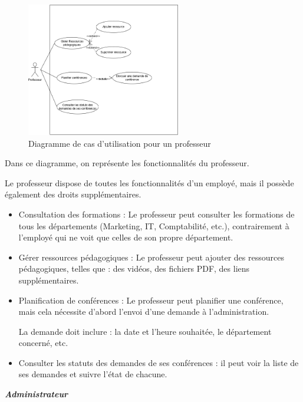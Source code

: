 \documentclass{article}
\begin{document}
\begin{figure}[H]
  \centering
  \includegraphics[width=0.6\textwidth]{prof(1.1).drawio.png}
  \caption{Diagramme de cas d'utilisation pour un professeur}
  \label{fig:profusecase}
\end{figure}
Dans ce diagramme, on représente les fonctionnalités du professeur.

\vspace{0,3cm}

\hspace*{2em} Le professeur dispose de toutes les fonctionnalités d’un employé, mais il possède également des droits supplémentaires.
\begin{itemize}
    \item Consultation des formations : 
Le professeur peut consulter les formations de tous les départements (Marketing, IT, Comptabilité, etc.), contrairement à l’employé qui ne voit que celles de son propre département.


\item Gérer ressources pédagogiques : 
Le professeur peut ajouter des ressources pédagogiques, telles que : des vidéos, des fichiers PDF, des liens supplémentaires.
\item Planification de conférences : 
Le professeur peut planifier une conférence, mais cela nécessite d'abord l'envoi d'une demande à l'administration.

La demande doit inclure : la date et l’heure souhaitée, le département concerné, etc.
\item Consulter les statuts des demandes de ses conférences : il peut voir la liste de ses demandes et suivre l’état de chacune.




\end{itemize}

\begin{center}
     \textbf{\textit{Administrateur}}
\end{center}
\end{document}
